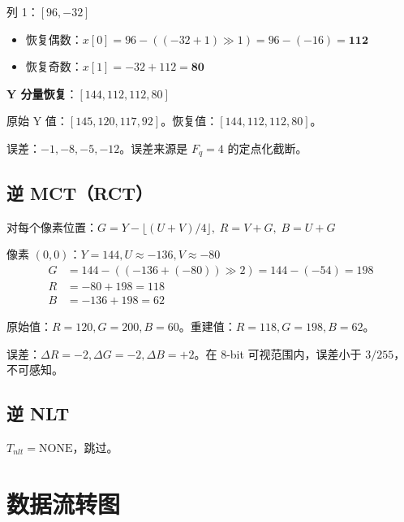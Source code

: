 列 1：$[96, -32]$
\begin{itemize}
  \item 恢复偶数：$x[0] = 96 - ((-32+1)\gg1) = 96 - (-16) = \mathbf{112}$
  \item 恢复奇数：$x[1] = -32 + 112 = \mathbf{80}$
\end{itemize}

\textbf{Y 分量恢复}：$[144, 112, 112, 80]$

原始 Y 值：$[145, 120, 117, 92]$。恢复值：$[144, 112, 112, 80]$。

误差：$-1, -8, -5, -12$。误差来源是 $F_q = 4$ 的定点化截断。

\subsection{逆 MCT（RCT）}

对每个像素位置：$G = Y - \lfloor(U + V)/4\rfloor,\; R = V + G,\; B = U + G$

像素 $(0,0)$：$Y=144, U \approx -136, V \approx -80$
\begin{align}
G &= 144 - ((-136 + (-80)) \gg 2) = 144 - (-54) = 198 \\
R &= -80 + 198 = 118 \\
B &= -136 + 198 = 62
\end{align}

原始值：$R=120, G=200, B=60$。重建值：$R=118, G=198, B=62$。

误差：$\Delta R = -2, \Delta G = -2, \Delta B = +2$。在 8-bit 可视范围内，误差小于 $3/255$，不可感知。

\subsection{逆 NLT}

$T_{nlt} = \mathrm{NONE}$，跳过。

\section{数据流转图}

